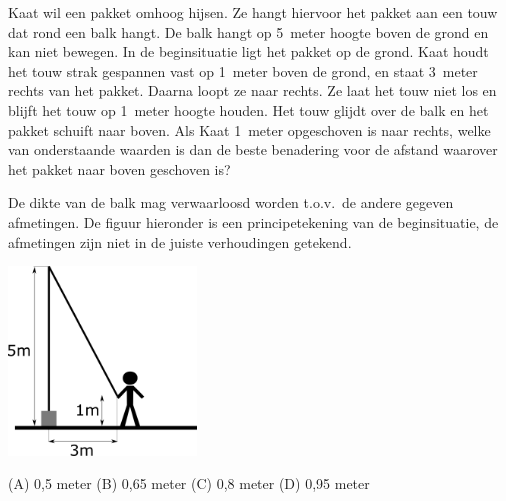 	
	Kaat wil een pakket omhoog hijsen.  Ze hangt hiervoor het pakket aan een touw dat rond een balk hangt.  De balk hangt op 5~meter hoogte boven de grond en kan niet bewegen.  In de beginsituatie ligt het pakket op de grond. Kaat houdt het touw strak gespannen vast op 1~meter boven de grond, en staat 3~meter rechts van het pakket.  Daarna loopt ze naar rechts. Ze laat het touw niet los en blijft het touw op 1~meter hoogte houden. Het touw glijdt over de balk en het pakket schuift naar boven.  Als Kaat 1~meter opgeschoven is naar rechts, welke van onderstaande waarden is dan de beste benadering voor de afstand waarover het pakket naar boven geschoven is?
	
	De dikte van de balk mag verwaarloosd worden t.o.v.\ de andere gegeven afmetingen. De figuur hieronder is een principetekening van de beginsituatie, de afmetingen zijn niet in de juiste verhoudingen getekend.
	
	\includegraphics[width=5cm]{pakket.png}
	
	\vspace{3mm}
	
	(A) 0,5 meter \hspace{1cm}
	(B) 0,65 meter \hspace{1cm}
	(C) 0,8 meter \hspace{1cm}
	(D) 0,95 meter
	
%	
%	


